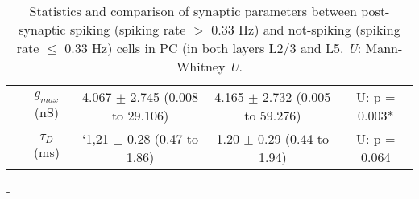 \begin{table}
{\begin{tabular}{|c|c|c|c|c|}
    \cline{2-5}
    &$g_{max}$ (nS) & 4.067 $\pm$ 2.745 (0.008 to 29.106) & 4.165 $\pm$ 2.732 (0.005 to 59.276)  & U: p = 0.003*\\[1pt]
    \cline{2-5}
    &$\tau_D$ (ms) &`1,21 $\pm$ 0.28 (0.47 to 1.86) & 1.20 $\pm$ 0.29 (0.44 to 1.94)  & U: p = 0.064\\[1pt]
    \hline
    \end{tabular}%
    }
    \caption{Statistics and comparison of synaptic parameters between post-synaptic spiking (spiking rate $>$ 0.33 Hz) and not-spiking (spiking rate $\leq$ 0.33 Hz) cells in PC (in both layers L2/3 and L5. \textit{U}: Mann-Whitney \textit{U}.}
    \label{tab:tab9}
\end{table}

\begin{table}
    \centering
    \caption{Statistics and comparison of probability of connection ($p_{con}$ through AMPA, NMDA and GABA synapses in post-synaptic spiking (spiking rate $>$ 0.33 Hz) and not-spiking (spiking rate $\leq$ 0.33 Hz) cells in the whole column. \textit{U}: Mann-Whitney \textit{U}.}
    \label{tab:tab9}
\end{table} - 

\begin{table}
    \centering
    \caption{Statistics and comparison of probability of connection ($p_{con}$ through AMPA, NMDA and GABA synapses in post-synaptic spiking (spiking rate $>$ 0.33 Hz) and not-spiking (spiking rate $\leq$ 0.33 Hz) cells in PC L2/3. \textit{U}: Mann-Whitney \textit{U}.}
    \label{tab:tab9}
\end{table}

